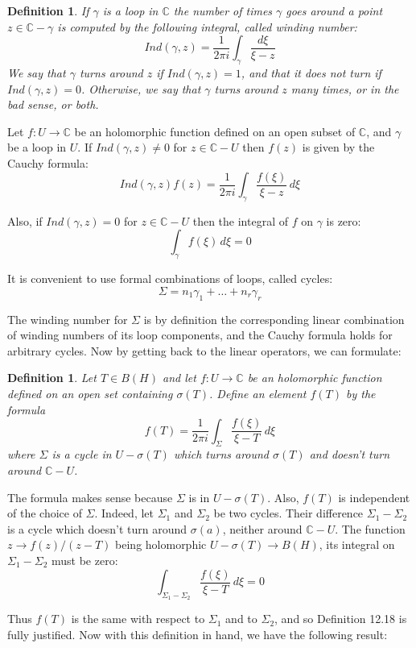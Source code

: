 \documentclass[12pt]{amsbook}
\newtheorem{definition}[theorem]{Definition}
\begin{document}
\begin{definition}
If $\gamma$ is a loop in $\mathbb C$ the number of times $\gamma$ goes around a point $z\in\mathbb C-\gamma$ is computed by the following integral, called winding number:
$$Ind(\gamma,z)=\frac{1}{2\pi i}\int_\gamma\frac{d\xi}{\xi -z}$$
We say that $\gamma$ turns around $z$ if $Ind(\gamma,z)=1$, and that it does not turn if $Ind(\gamma,z)=0$. Otherwise, we say that $\gamma$ turns around $z$ many times, or in the bad sense, or both.
\end{definition}

Let $f:U\to\mathbb C$ be an holomorphic function defined on an open subset of $\mathbb C$, and $\gamma$ be a loop in $U$. If $Ind(\gamma,z)\neq 0$ for $z\in\mathbb C-U$ then $f(z)$ is given by the Cauchy formula:
$$Ind(\gamma,z)f(z)=\frac{1}{2\pi i}\int_\gamma\frac{f(\xi )}{\xi -z}\,d\xi$$

Also, if $Ind(\gamma,z)=0$ for $z\in\mathbb C-U$ then the integral of $f$ on $\gamma$ is zero:
$$\int_\gamma f(\xi)\,d\xi=0$$

It is convenient to use formal combinations of loops, called cycles:
$$\Sigma=n_1\gamma_1+\ldots +n_r\gamma_r$$

The winding number for $\Sigma$ is by definition the corresponding linear combination of winding numbers of its loop components, and the Cauchy formula holds for arbitrary cycles. Now by getting back to the linear operators, we can formulate:

\begin{definition}
Let $T\in B(H)$ and let $f:U\to\mathbb C$ be an holomorphic function defined on an open set containing $\sigma(T)$. Define an element $f(T)$ by the formula
$$f(T)=\frac{1}{2\pi i}\int_\Sigma\frac{f(\xi)}{\xi-T}\,d\xi$$
where $\Sigma$ is a cycle in $U-\sigma(T)$ which turns around $\sigma(T)$ and doesn't turn around $\mathbb C-U$.
\end{definition}

The formula makes sense because $\Sigma$ is in $U-\sigma(T)$. Also, $f(T)$ is independent of the choice of $\Sigma$. Indeed, let $\Sigma_1$ and $\Sigma_2$ be two cycles. Their difference $\Sigma_1-\Sigma_2$ is a cycle which doesn't turn around $\sigma(a)$, neither around $\mathbb C-U$. The function $z\to f(z)/(z-T)$ being holomorphic $U-\sigma(T)\to B(H)$, its integral on $\Sigma_1-\Sigma_2$ must be zero:
$$\int_{\Sigma_1-\Sigma_2}\frac{f(\xi)}{\xi-T}\,d\xi =0$$

Thus $f(T)$ is the same with respect to $\Sigma_1$ and to $\Sigma_2$, and so Definition 12.18 is fully justified. Now with this definition in hand, we have the following result:
\end{document}
